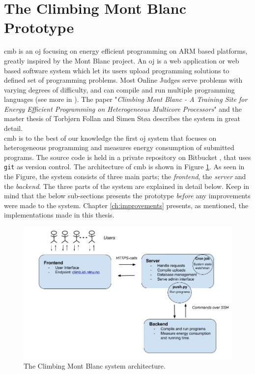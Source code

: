 \section{The Climbing Mont Blanc Prototype}
\label{sec:cmb}
\gls{cmb} is an \gls{oj} focusing on energy efficient programming on ARM based platforms, greatly inspired by the Mont Blanc project. An \gls{oj} is a web application or web based software system which let its users upload programming solutions to defined set of programming problems. Most Online Judges serve problems with varying degrees of difficulty, and can compile and run multiple programming languages (see more in ). The paper "\textit{Climbing Mont Blanc - A Training Site for Energy Efficient Programming on Heterogeneous Multicore Processors}" \cite{a:CMB} and the master thesis of Torbjørn Follan and Simen Støa \cite{mt:T&S} describes the system in great detail. \\

\gls{cmb} is to the best of our knowledge the first \gls{oj} system that focuses on heterogeneous programming and measures energy consumption of submitted programs. The source code is held in a private repository on Bitbucket \cite{BITBUCKET}, that uses \texttt{git} \cite{GIT} as version control. The architecture of \gls{cmb} is shown in Figure \ref{fig:cmb_arch}. As seen in the Figure, the system consists of three main parts; the \textit{frontend}, the \textit{server} and the \textit{backend}. The three parts of the system are explained in detail below. Keep in mind that the below sub-sections presents the prototype \textit{before} any improvements were made to the system. Chapter \ref{ch:improvements} presents, as mentioned, the implementations made in this thesis.

\begin{figure}
  \includegraphics[width=1.0\textwidth]{figs/cmb_arch.jpg}
  \caption[The Climbing Mont Blanc system architecture.]{The Climbing Mont Blanc system architecture.}
  \label{fig:cmb_arch}
\end{figure}

